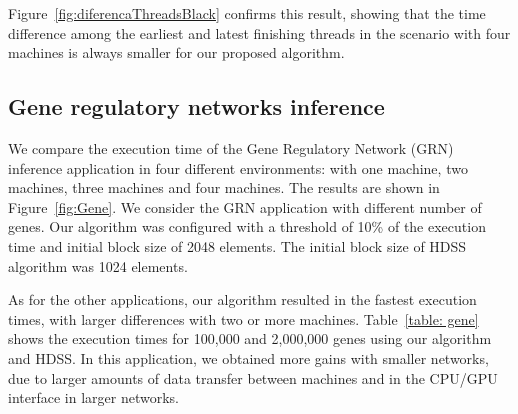 \documentclass[journal]{IEEEtran}
\begin{document}
Figure~\ref{fig:diferencaThreadsBlack} confirms this result, showing that the
time difference among the earliest and latest finishing threads in the
scenario with four machines is always smaller for our proposed algorithm.


\subsection{Gene regulatory networks inference}

We compare the execution time of the Gene Regulatory Network (GRN) inference
application in four different environments: with one machine, two machines,
three machines and four machines. The results are shown in
Figure~\ref{fig:Gene}. We consider the GRN application with different number of
genes. Our algorithm was configured with a threshold of 10\% of the execution time and initial block size of 2048 elements. The initial block size of HDSS algorithm was 1024 elements.




As for the other applications, our algorithm resulted in the fastest execution
times, with larger differences with two or more machines. Table~\ref{table:
  gene} shows the execution times for 100,000 and 2,000,000 genes using our
algorithm and HDSS. In this application, we obtained more gains with smaller
networks, due to larger amounts of data transfer between machines and in the
CPU/GPU interface in larger networks.

%
\end{document}
